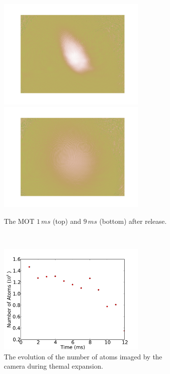 \begin{figure}[h]
\centering
    \begin{subfigure}[b]{0.3\textwidth}
    \centering
    \includegraphics[width=0.8\textwidth]{figs/MOTimage1.png}
    \includegraphics[width=0.8\textwidth]{figs/MOTimage2.png}
    \caption{The MOT $1\,\unit{ms}$ (top) and $9\,\unit{ms}$ (bottom) after release.}
    \end{subfigure}~~~\begin{subfigure}[b]{0.6\textwidth}
    \centering
    \includegraphics[width=0.8\textwidth]{figs/MOT_atom_count.pdf}
    \caption{The evolution of the number of atoms imaged by the camera during themal expansion.}
    \label{fig:mot_atom_count}
    \end{subfigure}
    \caption{}
\end{figure}

